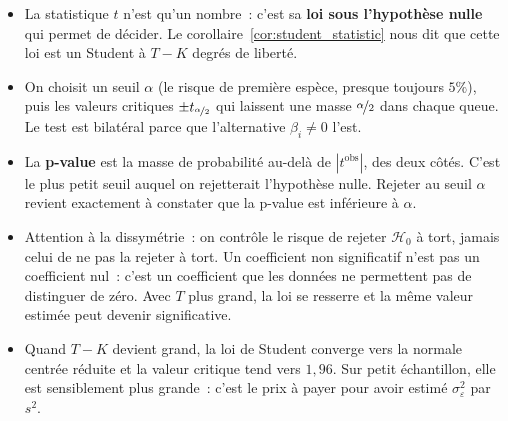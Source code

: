 \documentclass[10pt]{beamer}
\begin{document}
\begin{notes}

  \begin{itemize}

  \item La statistique $t$ n'est qu'un nombre~: c'est sa \textbf{loi sous l'hypothèse
    nulle} qui permet de décider. Le corollaire~\ref{cor:student_statistic} nous dit
    que cette loi est un Student à $T-K$ degrés de liberté.\newline

  \item On choisit un seuil $\alpha$ (le risque de première espèce, presque toujours
    $5\%$), puis les valeurs critiques $\pm t_{\nicefrac{\alpha}{2}}$ qui laissent une
    masse $\nicefrac{\alpha}{2}$ dans chaque queue. Le test est bilatéral parce que
    l'alternative $\beta_i\neq 0$ l'est.\newline

  \item La \textbf{p-value} est la masse de probabilité au-delà de
    $|t^{\text{obs}}|$, des deux côtés. C'est le plus petit seuil auquel on rejetterait
    l'hypothèse nulle. Rejeter au seuil $\alpha$ revient exactement à constater que la
    p-value est inférieure à $\alpha$.\newline

  \item Attention à la dissymétrie~: on contrôle le risque de rejeter $\mathcal H_0$ à
    tort, jamais celui de ne pas la rejeter à tort. Un coefficient non significatif
    n'est pas un coefficient nul~: c'est un coefficient que les données ne permettent
    pas de distinguer de zéro. Avec $T$ plus grand, la loi se resserre et la même
    valeur estimée peut devenir significative.\newline

  \item Quand $T-K$ devient grand, la loi de Student converge vers la normale centrée
    réduite et la valeur critique tend vers $1{,}96$. Sur petit échantillon, elle est
    sensiblement plus grande~: c'est le prix à payer pour avoir estimé
    $\sigma_{\varepsilon}^2$ par $s^2$.

  \end{itemize}

\end{notes}
\end{document}
